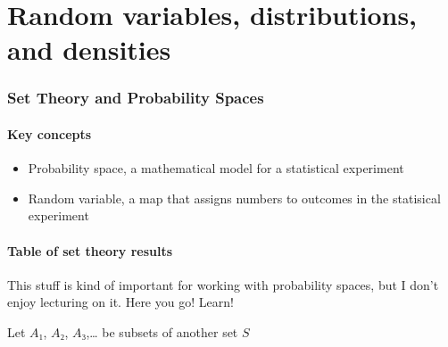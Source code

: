 

\part*{Random variables, distributions, and densities}%

\section{Set Theory and Probability Spaces}

\subsection{Key concepts}

\begin{itemize}
\item Probability space, a mathematical model for a statistical experiment
\item Random variable, a map that assigns numbers to outcomes in the
       statisical experiment
\end{itemize}

\subsection{Table of set theory results}

This stuff is kind of important for working with probability spaces,
but I don't enjoy lecturing on it.  Here you go!  Learn!

Let $A₁$, $A₂$, $A₃$,… be subsets of another set $S$

